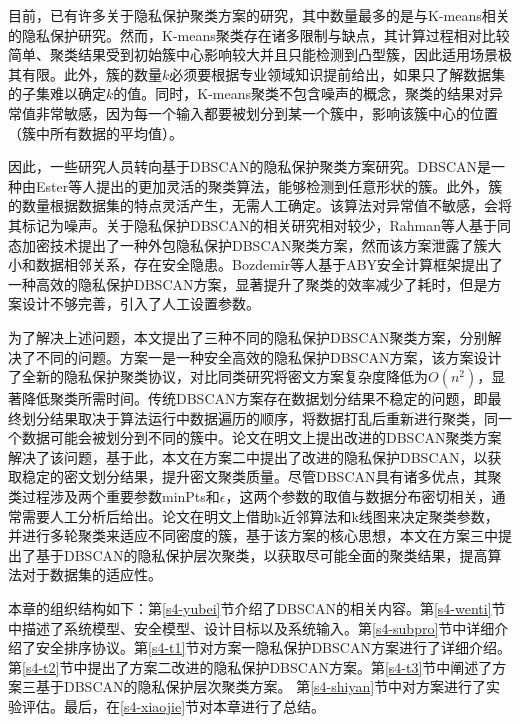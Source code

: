 目前，已有许多关于隐私保护聚类方案的研究，其中数量最多的是与K-means相关的隐私保护研究\cite{hegde2021sok}。然而，K-means聚类存在诸多限制与缺点，其计算过程相对比较简单、聚类结果受到初始簇中心影响较大并且只能检测到凸型簇，因此适用场景极其有限。此外，簇的数量$k$必须要根据专业领域知识提前给出，如果只了解数据集的子集难以确定$k$的值。同时，K-means聚类不包含噪声的概念，聚类的结果对异常值非常敏感，因为每一个输入都要被划分到某一个簇中，影响该簇中心的位置（簇中所有数据的平均值）。

因此，一些研究人员转向基于DBSCAN的隐私保护聚类方案研究。DBSCAN是一种由Ester等人\cite{ester1996density}提出的更加灵活的聚类算法，能够检测到任意形状的簇。此外，簇的数量根据数据集的特点灵活产生，无需人工确定。该算法对异常值不敏感，会将其标记为噪声。关于隐私保护DBSCAN的相关研究相对较少，Rahman等人\cite{rahman2017towards}基于同态加密技术提出了一种外包隐私保护DBSCAN聚类方案，然而该方案泄露了簇大小和数据相邻关系，存在安全隐患。Bozdemir等人\cite{bozdemir2021privacy}基于ABY安全计算框架提出了一种高效的隐私保护DBSCAN方案，显著提升了聚类的效率减少了耗时，但是方案设计不够完善，引入了人工设置参数。

为了解决上述问题，本文提出了三种不同的隐私保护DBSCAN聚类方案，分别解决了不同的问题。方案一是一种安全高效的隐私保护DBSCAN方案，该方案设计了全新的隐私保护聚类协议，对比同类研究将密文方案复杂度降低为$O(n^2)$，显著降低聚类所需时间。传统DBSCAN方案存在数据划分结果不稳定的问题，即最终划分结果取决于算法运行中数据遍历的顺序，将数据打乱后重新进行聚类，同一个数据可能会被划分到不同的簇中。论文\cite{tran2013revised}在明文上提出改进的DBSCAN聚类方案解决了该问题，基于此，本文在方案二中提出了改进的隐私保护DBSCAN，以获取稳定的密文划分结果，提升密文聚类质量。尽管DBSCAN具有诸多优点，其聚类过程涉及两个重要参数minPts和$\epsilon$，这两个参数的取值与数据分布密切相关，通常需要人工分析后给出。论文\cite{latifi2021dbhc}在明文上借助k近邻算法和k线图来决定聚类参数，并进行多轮聚类来适应不同密度的簇，基于该方案的核心思想，本文在方案三中提出了基于DBSCAN的隐私保护层次聚类，以获取尽可能全面的聚类结果，提高算法对于数据集的适应性。

本章的组织结构如下：第\ref{s4-yubei}节介绍了DBSCAN的相关内容。第\ref{s4-wenti}节中描述了系统模型、安全模型、设计目标以及系统输入。第\ref{s4-subpro}节中详细介绍了安全排序协议。第\ref{s4-t1}节对方案一隐私保护DBSCAN方案进行了详细介绍。第\ref{s4-t2}节中提出了方案二改进的隐私保护DBSCAN方案。第\ref{s4-t3}节中阐述了方案三基于DBSCAN的隐私保护层次聚类方案。
第\ref{s4-shiyan}节中对方案进行了实验评估。最后，在\ref{s4-xiaojie}节对本章进行了总结。

